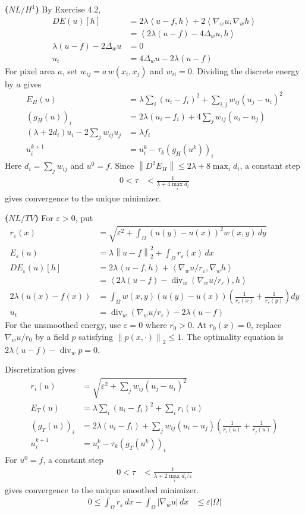 \documentclass[12pt,letterpaper]{article}
\newcommand{\diver}{\operatorname{div}}
\newcommand{\eps}{\varepsilon}
\newcommand{\norm}[1]{\left\lVert #1\right\rVert}
\newcommand{\ip}[2]{\left\langle #1,#2\right\rangle}
\newcommand{\partlabel}[1]{\par\medskip\noindent\textbf{(#1)}\enspace}
\begin{document}
\partlabel{$NL/H^1$}
By Exercise 4.2,
\begin{align*}
 DE(u)[h]
 &=2\lambda\ip{u-f}{h}+2\ip{\nabla_wu}{\nabla_wh}\\
 &=\ip{2\lambda(u-f)-4\Delta_wu}{h}
\\[3pt]
 \lambda(u-f)-2\Delta_wu&=0\\
 u_t&=4\Delta_wu-2\lambda(u-f)
\end{align*}
For pixel area $a$, set $w_{ij}=a\,w(x_i,x_j)$ and $w_{ii}=0$.
Dividing the discrete energy by $a$ gives
\begin{align*}
 E_H(u)&=\lambda\sum_i(u_i-f_i)^2
          +\sum_{i,j}w_{ij}(u_j-u_i)^2
\\[3pt]
 (g_H(u))_i&=2\lambda(u_i-f_i)+4\sum_jw_{ij}(u_i-u_j)\\
 (\lambda+2d_i)u_i-2\sum_jw_{ij}u_j&=\lambda f_i\\
 u_i^{k+1}&=u_i^k-\tau_k(g_H(u^k))_i
\end{align*}
Here $d_i=\sum_jw_{ij}$ and $u^0=f$.
Since $\norm{D^2E_H}\leq2\lambda+8\max_i d_i$, a constant step
\begin{align*}
 0<\tau&<\frac1{\lambda+4\max_i d_i}
\end{align*}
gives convergence to the unique minimizer.

\clearpage
\partlabel{$NL/TV$}
For $\eps>0$, put
\begin{align*}
 r_\eps(x)&=\sqrt{\eps^2+\int_\Omega(u(y)-u(x))^2w(x,y)\,dy}\\
 E_\eps(u)&=\lambda\norm{u-f}_2^2+\int_\Omega r_\eps(x)\,dx
\\[3pt]
 DE_\eps(u)[h]
 &=2\lambda\ip{u-f}{h}
   +\ip{\nabla_wu/r_\eps}{\nabla_wh}\\
 &=\ip{2\lambda(u-f)-\diver_w(\nabla_wu/r_\eps)}{h}
\\[3pt]
 2\lambda(u(x)-f(x))
 &=\int_\Omega w(x,y)(u(y)-u(x))
       \left(\frac1{r_\eps(x)}+\frac1{r_\eps(y)}\right)dy\\
 u_t&=\diver_w(\nabla_wu/r_\eps)-2\lambda(u-f)
\end{align*}
For the unsmoothed energy, use $\eps=0$ where $r_0>0$.
At $r_0(x)=0$, replace $\nabla_wu/r_0$ by a field $p$ satisfying
$\norm{p(x,\cdot)}_2\leq1$. The optimality equation is
$2\lambda(u-f)-\diver_wp=0$.

Discretization gives
\begin{align*}
 r_i(u)&=\sqrt{\eps^2+\sum_jw_{ij}(u_j-u_i)^2}\\
 E_T(u)&=\lambda\sum_i(u_i-f_i)^2+\sum_i r_i(u)\\
 (g_T(u))_i
 &=2\lambda(u_i-f_i)
   +\sum_jw_{ij}(u_i-u_j)\left(\frac1{r_i(u)}+\frac1{r_j(u)}\right)\\
 u_i^{k+1}&=u_i^k-\tau_k(g_T(u^k))_i
\end{align*}
For $u^0=f$, a constant step
\begin{align*}
 0<\tau&<\frac1{\lambda+2\max_i d_i/\eps}
\end{align*}
gives convergence to the unique smoothed minimizer.
\begin{align*}
 0\leq\int_\Omega r_\eps\,dx-\int_\Omega|\nabla_wu|\,dx
 &\leq\eps|\Omega|
\end{align*}
\end{document}
